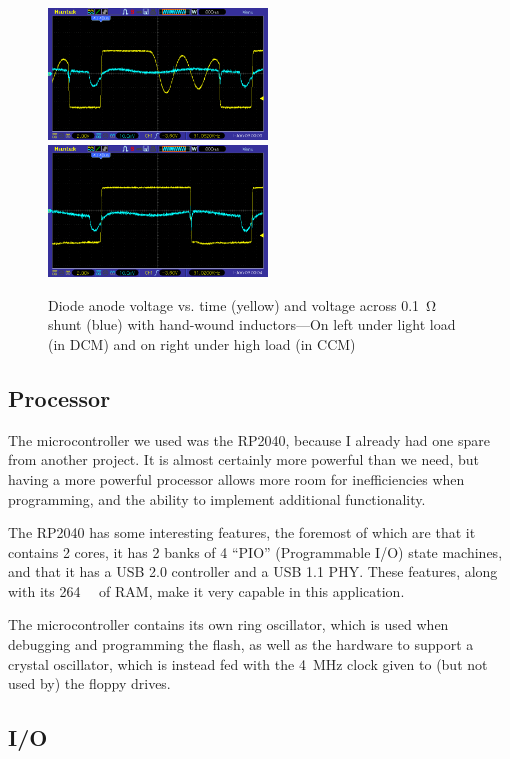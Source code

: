 \documentclass[a4paper]{article}
\begin{document}
\begin{figure}
  \centering
  \includegraphics[height=3.5cm]{pic_25_1}\hfill\includegraphics[height=3.5cm]{pic_25_4}
  \caption[Voltage and current traces with handwound inductors]{Diode
    anode voltage vs. time (yellow) and voltage across \qty{0.1}{\ohm}
    shunt (blue) with hand-wound inductors---On left under light load (in
    DCM) and on right under high load (in CCM)}
\end{figure}

\subsection{Processor}

The microcontroller we used was the RP2040, because I already had one
spare from another project. It is almost certainly more powerful than
we need, but having a more powerful processor allows more room for
inefficiencies when programming, and the ability to implement
additional functionality.

The RP2040 has some interesting features, the foremost of which are
that it contains 2 cores, it has 2 banks of 4 ``PIO'' (Programmable
I/O) state machines, and that it has a USB 2.0 controller and a USB
1.1 PHY. These features, along with its \qty{264}{\kibi\byte} of RAM,
make it very capable in this application.

The microcontroller contains its own ring oscillator, which is used
when debugging and programming the flash, as well as the hardware to
support a crystal oscillator, which is instead fed with the
\qty{4}{\MHz} clock given to (but not used by) the floppy drives.

\subsection{I/O}
\end{document}
